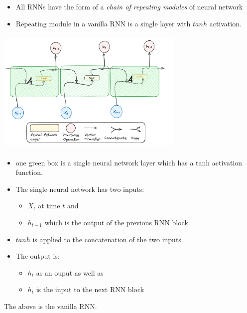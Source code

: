 \documentclass{article}
\begin{document}
\begin{itemize}
    \item All RNNs have the form of a \textit{  chain of repeating modules} of neural network
    \item Repeating module in a vanilla RNN is a single layer with $tanh$ activation.
\end{itemize}
\begin{center}
  \includegraphics[width=9cm, height=6cm]{LSTM/images/LSTM1.png}
\end{center}

\begin{itemize}
    \item one green box is a single neural network layer which has a tanh activation function.
    \item The single neural network has two inputs:
    \begin{itemize}
        \item $X_t$ at time $t$ and 
        \item $h_{t-1}$  which is the output of the previous RNN block.
    \end{itemize} 
    \item $tanh$ is applied to the concatenation of the two inputs 
    \item The output is:
    \begin{itemize}
        \item $h_t$ as an ouput as well as 
        \item $h_t$ is the input to the next RNN block
    \end{itemize}
\end{itemize}
The above is the vanilla RNN. 
\end{document}
